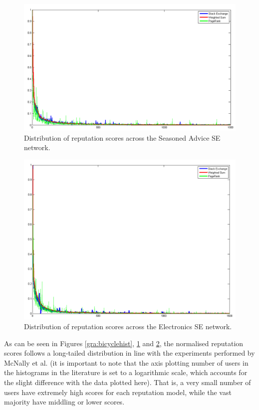 \documentclass[]{final_report}
\begin{document}
\begin{figure}[ht!]
\centering
\includegraphics[width=130mm]{chap5/cooking_line.png}
\caption{Distribution of reputation scores across the Seasoned Advice SE network.}
\label{gra:cookinghist}
\end{figure}

\begin{figure}[ht!]
\centering
\includegraphics[width=130mm]{chap5/electronics_line.png}
\caption{Distribution of reputation scores across the Electronics SE network.}
\label{gra:electronicshist}
\end{figure}

As can be seen in Figures \ref{gra:bicyclehist}, \ref{gra:cookinghist} and \ref{gra:electronicshist}, the normalised reputation scores follows a long-tailed distribution in line with the experiments performed by McNally et al. (it is important to note that the axis plotting number of users in the histograms in the literature is set to a logarithmic scale, which accounts for the slight difference with the data plotted here). That is, a very small number of users have extremely high scores for each reputation model, while the vast majority have middling or lower scores.
\end{document}
